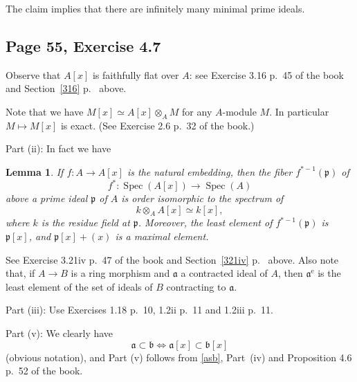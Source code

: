 \documentclass[parskip=half,fontsize=12pt]{scrartcl}%
\newcommand{\oo}{\operatorname}\newcommand{\ooo}{\operatorname*}
\newcommand{\mf}{\mathfrak}
\newcommand{\aaa}{\mf a}
\newcommand{\bbb}{\mf b}
\newcommand{\ppp}{\mf p}
\newcommand{\Spec}{\operatorname{Spec}}\newcommand{\Sp}{\operatorname{Spec}}
\newtheorem{lem}[thm]{Lemma}
\begin{document}
The claim implies that there are infinitely many minimal prime ideals. %

\subsection{Page 55, Exercise 4.7}\label{5547}%

Observe that $A[x]$ is faithfully flat over $A$: see Exercise 3.16 p.~45 of the book and Section~\ref{316} p.~\pageref{316} above.

Note that we have $M[x]\simeq A[x]\otimes_AM$ for any $A$-module $M$. In particular $M\mapsto M[x]$ is exact. (See Exercise 2.6 p.~32 of the book.)

Part (ii): In fact we have 

\begin{lem}\label{fiberx}
If $f:A\to A[x]$ is the natural embedding, %
then the fiber $f^{*-1}(\ppp)$ of 
$$
f^*:\Spec(A[x])\to\Spec(A)
$$ 
above a prime ideal $\ppp$ of $A$ is order isomorphic to the spectrum of 
$$
k\otimes_AA[x]\simeq k[x],
$$ 
where $k$ is the residue field at $\ppp$. %
Moreover, the least element of $f^{*-1}(\ppp)$ is $\ppp[x]$, and $\ppp[x]+(x)$ is a maximal element.
\end{lem}

See Exercise 3.21iv p.~47 of the book and Section~\ref{321iv} p.~\pageref{321iv} above. Also note that, if $A\to B$ is a ring morphism and $\aaa$ a contracted ideal of $A$, then $\aaa^{\oo e}$ is the least element of the set of ideals of $B$ contracting to $\aaa$.

Part (iii): Use Exercises 1.18 p.~10, 1.2ii p.~11 and 1.2iii p.~11. %


Part (v): We clearly have 
\begin{equation}\label{asb}
\aaa\subset\bbb\iff\aaa[x]\subset\bbb[x]
\end{equation}
(obvious notation), and Part (v) follows from \eqref{asb}, Part~(iv) and Proposition 4.6 p.~52 of the book.
\end{document}
